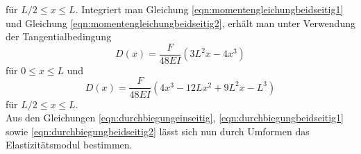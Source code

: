 für $L/2 \leq x \leq L$.
Integriert man Gleichung \eqref{eqn:momentengleichungbeidseitig1} und Gleichung \eqref{eqn:momentengleichungbeidseitig2},
erhält man unter Verwendung der Tangentialbedingung
\begin{equation}
  D(x) = \frac{F}{48 E I} \left( 3 L^2 x -4 x^3 \right)
  \label{eqn:durchbiegungbeidseitig1}
\end{equation}
für $0 \leq x \leq L$ und
\begin{equation}
  D(x) = \frac{F}{48 E I} \left( 4 x^3 -12 L x^2 +9 L^2 x-L^3 \right)
  \label{eqn:durchbiegungbeidseitig2}
\end{equation}
für $L/2 \leq x \leq L$.
\\
Aus den Gleichungen \eqref{eqn:durchbiegungeinseitig}, \eqref{eqn:durchbiegungbeidseitig1} sowie \eqref{eqn:durchbiegungbeidseitig2}
lässt sich nun durch Umformen das Elastizitätsmodul bestimmen.
